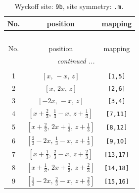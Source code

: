 \documentclass[fleqn,8pt]{jsarticle}
\begin{document}
\begin{longtable}{ccc}
\caption{Wyckoff site: {\tt 9b}, site symmetry: {\tt .m.}}
 \\
 \hline \hline
No. & position & mapping \\ \hline \endfirsthead

\multicolumn{2}{l}{\tablename\ \thetable{}} \\
 \hline \hline
No. & position & mapping \\ \hline \endhead

 \hline \hline
\multicolumn{2}{r}{\footnotesize\it continued ...} \\ \endfoot

 \hline \hline
\multicolumn{2}{r}{} \\ \endlastfoot

1 & $\left[ x,\, - x,\, z \right]$ & {\tt [1,5]} \\ \hline
2 & $\left[ x,\, 2 x,\, z \right]$ & {\tt [2,6]} \\ \hline
3 & $\left[ - 2 x,\, - x,\, z \right]$ & {\tt [3,4]} \\ \hline
4 & $\left[ x + \frac{2}{3},\, \frac{1}{3} - x,\, z + \frac{1}{3} \right]$ & {\tt [7,11]} \\ \hline
5 & $\left[ x + \frac{2}{3},\, 2 x + \frac{1}{3},\, z + \frac{1}{3} \right]$ & {\tt [8,12]} \\ \hline
6 & $\left[ \frac{2}{3} - 2 x,\, \frac{1}{3} - x,\, z + \frac{1}{3} \right]$ & {\tt [9,10]} \\ \hline
7 & $\left[ x + \frac{1}{3},\, \frac{2}{3} - x,\, z + \frac{2}{3} \right]$ & {\tt [13,17]} \\ \hline
8 & $\left[ x + \frac{1}{3},\, 2 x + \frac{2}{3},\, z + \frac{2}{3} \right]$ & {\tt [14,18]} \\ \hline
9 & $\left[ \frac{1}{3} - 2 x,\, \frac{2}{3} - x,\, z + \frac{2}{3} \right]$ & {\tt [15,16]} \\
\end{longtable}
\renewcommand{\arraystretch}{1.2}
\end{document}
